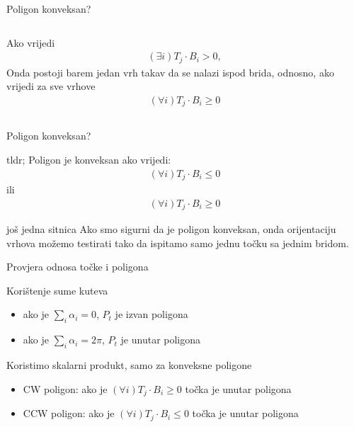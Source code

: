 \documentclass[9pt]{beamer}
\begin{document}
\begin{frame}{Poligon konveksan?}
\begin{columns}
\begin{column}[t]{0.5\textwidth}
\begin{figure}
			\end{figure}
			Ako vrijedi 
			\begin{align*}
			(\exists i) T_j \cdot B_i > 0 ,
			\end{align*}
			Onda postoji barem jedan vrh takav da se nalazi ispod brida, odnosno, ako vrijedi za sve vrhove
			\begin{align*}
			(\forall i) T_j \cdot B_i \geq 0 
			\end{align*}
		\end{column}
	\end{columns}	
\end{frame}
\begin{frame}{Poligon konveksan?}
	\begin{block}{tldr;}
		Poligon je konveksan ako vrijedi:
		\begin{align*}
		(\forall i) T_j \cdot B_i \leq 0
		\end{align*}
		ili
		\begin{align*}
		(\forall i) T_j \cdot B_i \geq 0 
		\end{align*}
	\end{block}
	\begin{block}{još jedna sitnica}
		Ako smo sigurni da je poligon konveksan, onda orijentaciju vrhova možemo testirati tako da ispitamo samo jednu točku sa jednim bridom.
	\end{block}
\end{frame}
\begin{frame}{Provjera odnosa točke i poligona}
	\begin{block}{Korištenje sume kuteva}
		\begin{itemize}
			\item ako je $\sum_{i} \alpha_{i} = 0$, $P_{t}$ je izvan poligona
			\item ako je $\sum_{i} \alpha_{i} = 2\pi$, $P_{t}$ je unutar poligona 
		\end{itemize}
	\end{block}
	
	\begin{block}{Koristimo skalarni produkt, samo za konveksne poligone}
		\begin{itemize}
			\item CW poligon: ako je $(\forall i) T_j \cdot B_i \geq 0$ točka je unutar poligona
			\item CCW poligon: ako je $(\forall i) T_j \cdot B_i \leq 0$ točka je unutar poligona 
		\end{itemize}
	\end{block}
\end{frame}
\end{document}

